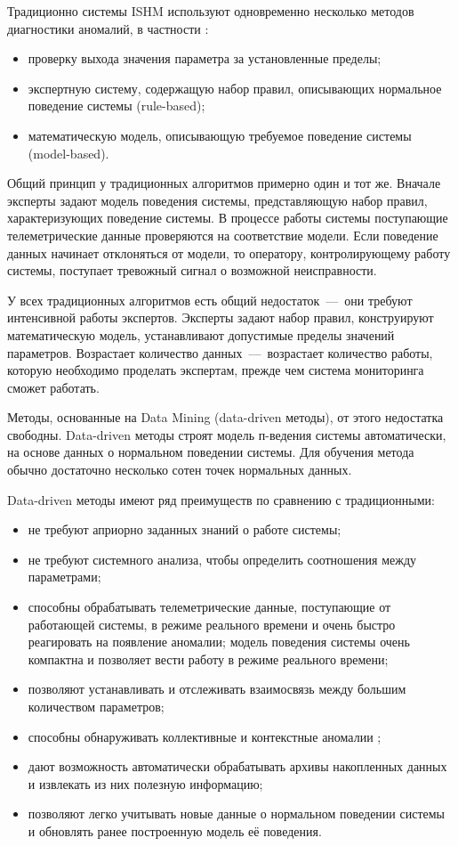 Традиционно системы ISHM используют одновременно несколько методов диагностики аномалий, в частности \cite{FaultDetectionByMiningAssocRules}:
\begin{itemize}
	\item проверку выхода значения параметра за установленные пределы;
	\item экспертную систему, содержащую набор правил, описывающих нормальное поведение системы (rule-based);
	\item математическую модель, описывающую требуемое поведение системы (model-based).
\end{itemize}

Общий  принцип у традиционных алгоритмов примерно один и тот же. Вначале эксперты задают модель поведения системы, представляющую набор правил,  характеризующих поведение системы. В процессе работы системы поступающие телеметрические данные проверяются на соответствие модели. Если поведение данных начинает отклоняться от модели, то оператору, контролирующему работу системы, поступает тревожный сигнал о возможной неисправности.

У всех традиционных алгоритмов есть общий недостаток~–--~они требуют  интенсивной работы экспертов. Эксперты задают набор правил, конструируют  математическую модель, устанавливают допустимые пределы значений параметров. Возрастает количество данных~–--~возрастает количество работы, которую необходимо проделать экспертам, прежде чем система мониторинга сможет работать.
 
Методы, основанные на Data Mining (data-­driven методы), от этого недостатка свободны. Data-­driven методы строят модель п-ведения системы автоматически,  на основе данных о нормальном поведении системы. Для обучения метода обычно достаточно несколько сотен точек нормальных данных.

Data-driven методы имеют ряд преимуществ по сравнению с традиционными:
\begin{itemize}
	\item не требуют априорно заданных знаний о работе системы;
	\item не требуют системного анализа, чтобы определить соотношения между параметрами;
	\item способны обрабатывать телеметрические данные,  поступающие от работающей системы, в режиме реального времени и очень быстро реагировать на появление аномалии; модель поведения системы очень компактна и позволяет вести работу в режиме реального времени;
	\item позволяют устанавливать и отслеживать взаимосвязь между большим количеством параметров;
	\item способны обнаруживать коллективные и контекстные аномалии \cite{AnomalyDetectionASurvey};
	\item дают возможность автоматически обрабатывать архивы накопленных данных и извлекать из них полезную информацию;
	\item позволяют легко учитывать новые данные о нормальном поведении системы и обновлять ранее построенную модель её поведения.
\end{itemize}